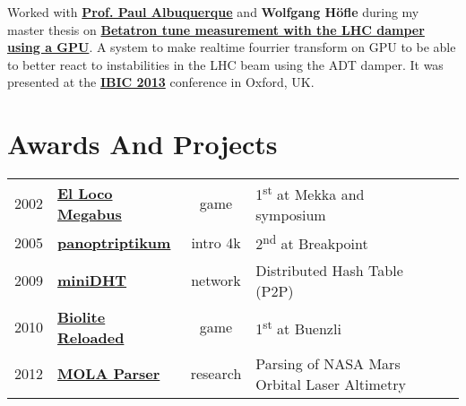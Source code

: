 \documentclass[a4paper]{deedy-resume} %
\begin{document}
\begin{minipage}[t]{0.66\textwidth}
Worked with
\textbf{\href{http://ch.linkedin.com/pub/paul-albuquerque/12/366/809}{Prof. Paul Albuquerque}}
and \textbf{Wolfgang Höf\/le} during my master thesis on
\textbf{\href{http://cds.cern.ch/record/1545785?ln=en}{Betatron tune measurement
with the LHC damper using a GPU}}. A system to make realtime fourrier transform
on GPU to be able to better react to instabilities in the LHC beam using the ADT
damper. It was presented at the \textbf{\href{http://www.ibic2013.org}{IBIC 2013}}
conference in Oxford, UK.

\sectionspace %





\section{Awards And Projects}

\begin{tabular}{rlcll}
2002 & \textbf{\href{http://www.pouet.net/prod.php?which=5652}{El Loco Megabus}} &
    game & 1\textsuperscript{st} at Mekka and symposium \\
2005 & \textbf{\href{http://www.pouet.net/prod.php?which=16393}{panoptriptikum}} &
    intro 4k & 2\textsuperscript{nd} at Breakpoint \\
2009 & \textbf{\href{https://github.com/anirul/miniDHT}{miniDHT}} &
    network & Distributed Hash Table (P2P) \\
2010 & \textbf{\href{http://www.pouet.net/prod.php?which=55711}{Biolite Reloaded}} &
    game & 1\textsuperscript{st} at Buenzli \\
2012 & \textbf{\href{https://github.com/anirul/MOLA_parser}{MOLA Parser}} &
    research & Parsing of NASA Mars Orbital Laser Altimetry \\
\end{tabular}



\end{minipage}
\end{document}
